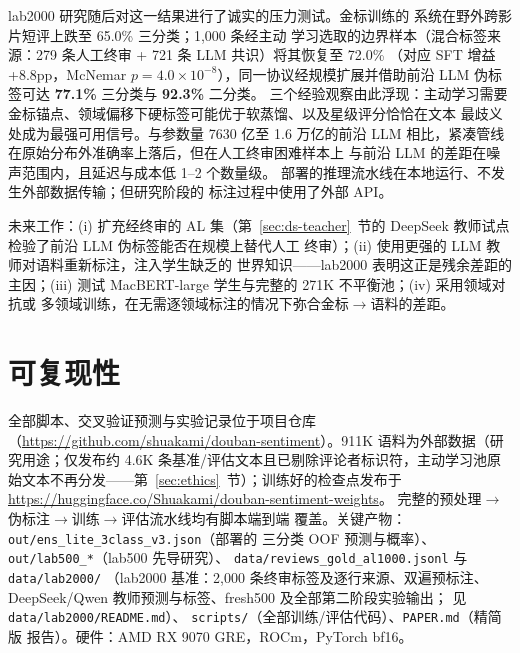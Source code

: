 \documentclass[11pt,a4paper]{article}
\newcommand{\code}[1]{\texttt{#1}}
\begin{document}
lab2000 研究随后对这一结果进行了诚实的压力测试。金标训练的
系统在野外跨影片短评上跌至 65.0\% 三分类；1{,}000 条经主动
学习选取的边界样本（混合标签来源：279 条人工终审 + 721 条
LLM 共识）将其恢复至 72.0\%
（对应 SFT 增益 +8.8pp，McNemar $p = 4.0\times10^{-8}$），同一协议经规模扩展并借助前沿
LLM 伪标签可达 \textbf{77.1\%} 三分类与 \textbf{92.3\%} 二分类。
三个经验观察由此浮现：主动学习需要
金标锚点、领域偏移下硬标签可能优于软蒸馏、以及星级评分恰恰在文本
最歧义处成为最强可用信号。与参数量 7630 亿至 1.6 万亿的前沿
LLM 相比，紧凑管线在原始分布外准确率上落后，但在人工终审困难样本上
与前沿 LLM 的差距在噪声范围内，且延迟与成本低 1--2 个数量级。
部署的推理流水线在本地运行、不发生外部数据传输；但研究阶段的
标注过程中使用了外部 API。

未来工作：(i) 扩充经终审的 AL 集（第~\ref{sec:ds-teacher}~节的
DeepSeek 教师试点检验了前沿 LLM 伪标签能否在规模上替代人工
终审）；(ii) 使用更强的 LLM 教师对语料重新标注，注入学生缺乏的
世界知识——lab2000 表明这正是残余差距的主因；(iii) 测试
MacBERT-large 学生与完整的 271K 不平衡池；(iv) 采用领域对抗或
多领域训练，在无需逐领域标注的情况下弥合金标$\to$语料的差距。

\section*{可复现性}

\begin{sloppypar}
全部脚本、交叉验证预测与实验记录位于项目仓库
（\url{https://github.com/shuakami/douban-sentiment}）。911K 语料为外部数据（研究用途；仅发布约 4.6K 条基准/评估文本且已剔除评论者标识符，主动学习池原始文本不再分发——第~\ref{sec:ethics}~节）；训练好的检查点发布于
\url{https://huggingface.co/Shuakami/douban-sentiment-weights}。
完整的预处理$\to$伪标注$\to$训练$\to$评估流水线均有脚本端到端
覆盖。关键产物：\code{out/ens\_lite\_3class\_v3.json}（部署的
三分类 OOF 预测与概率）、\code{out/lab500\_*}（lab500 先导研究）、
\code{data/reviews\_gold\_al1000.jsonl} 与 \code{data/lab2000/}
（lab2000 基准：2{,}000 条终审标签及逐行来源、双遍预标注、
DeepSeek/Qwen 教师预测与标签、fresh500 及全部第二阶段实验输出；
见 \code{data/lab2000/README.md}）、
\code{scripts/}（全部训练/评估代码）、\code{PAPER.md}（精简版
报告）。硬件：AMD RX 9070 GRE，ROCm，PyTorch bf16。
\end{sloppypar}

\appendix
\end{document}
